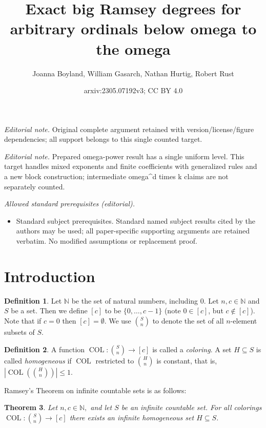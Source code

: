 \documentclass[10pt,a4paper]{article}
\title{Exact big Ramsey degrees for arbitrary ordinals below omega to the omega}
\author{Joanna Boyland, William Gasarch, Nathan Hurtig, Robert Rust}
\date{arxiv:2305.07192v3; CC BY 4.0}
\newcommand{\COL}{\operatorname{COL}}
\newcommand{\N}{\mathbb{N}}
\newcommand{\numpoints}{n}
\newcommand{\numcolors}{c}
\theoremstyle{plain}
\newtheorem{theorem}{Theorem}[section]
\theoremstyle{definition}
\newtheorem{definition}[theorem]{Definition}
\begin{document}
\maketitle
\noindent\textit{Editorial note.} Original complete argument retained with version/license/figure dependencies; all support belongs to this single counted target.\par\medskip
\noindent\textit{Editorial note.} Prepared omega-power result has a single uniform level. This target handles mixed exponents and finite coefficients with generalized rules and a new block construction; intermediate omega\textasciicircum{}d times k claims are not separately counted.\par\medskip
\noindent\textit{Allowed standard prerequisites (editorial).}\begin{itemize}
\item Standard subject prerequisites. Standard named subject results cited by the authors may be used; all paper-specific supporting arguments are retained verbatim. No modified assumptions or replacement proof.
\end{itemize}\medskip
\section{Introduction}


\begin{definition}
Let $\N$ be the set of natural numbers, including 0. 
Let $\numpoints,\numcolors \in \N$ and $S$ be a set. Then we define $[\numcolors]$ to be $ \{ 0, \ldots, \numcolors-1\}$
(note $0 \in [\numcolors]$, but $\numcolors \not \in [\numcolors]$). Note that if $\numcolors=0$ then $[\numcolors] = \emptyset$. 
We use $\binom{S}{\numpoints}$ to denote the set of all $\numpoints$-element subsets of $S$. 
\end{definition}
\begin{definition}
    A function $\COL\colon \binom{S}{\numpoints} \to [\numcolors]$ is called a \textit{coloring}.
    A set $H\subseteq S$ is called \textit{homogeneous} if $\COL$ restricted to 
    $\binom{H}{\numpoints}$ is constant,
    that is, $\left|\COL\left(\binom{H}{\numpoints}\right)\right|\le 1$.
\end{definition}

Ramsey's Theorem on infinite countable sets \cite{Ramsey-1930} is as follows:
\begin{theorem} 
Let $\numpoints,\numcolors\in\N,$ and let $S$ be an infinite countable set.  
For all colorings $\COL\colon \binom{S}{\numpoints}\to [\numcolors]$ 
there exists an infinite homogeneous set $H\subseteq S$. 
\end{theorem} 
\end{document}
